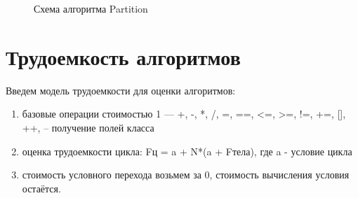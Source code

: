 \documentclass[12pt]{report}
\begin{document}
\newpage
\begin{figure}[h]
\caption{Схема алгоритма Partition}
\label{ris:imageP}
\end{figure}

\section{Трудоемкость алгоритмов}
Введем модель трудоемкости для оценки алгоритмов:
\begin{enumerate}
  	\item  базовые операции стоимостью 1 — +, -, *, /, =, ==, <=, >=, !=, +=, [], ++, -- получение полей класса
	\item оценка трудоемкости цикла: Fц = a + N*(a + Fтела), где a - условие цикла
	\item стоимость условного перехода возьмем за 0, стоимость вычисления условия остаётся.
\end{enumerate}
\end{document}
